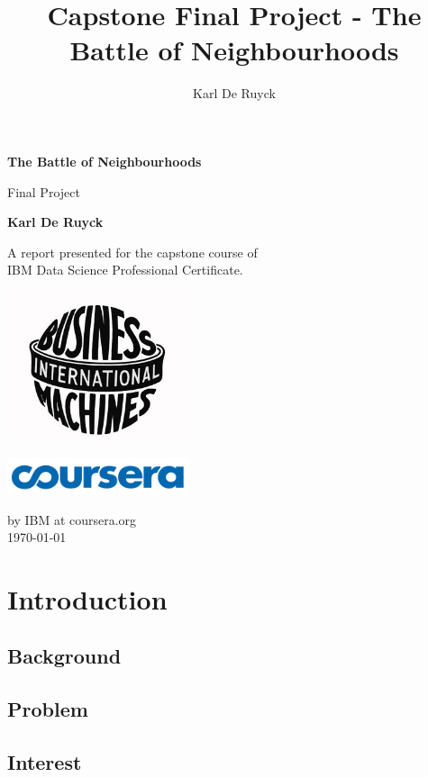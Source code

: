 \documentclass[10pt,a4paper,final,titlepage]{report}
\author{Karl De Ruyck}
\title{Capstone Final Project - The Battle of Neighbourhoods}
\begin{document}
	\onehalfspacing
	\begin{titlepage}
		\begin{center}

			\vspace*{3cm}
			{\Huge \textbf{The Battle of Neighbourhoods}}\\
					
			\vspace{1cm}
			
			{\LARGE Final Project}
			
			\vspace{2cm}
			
			\textbf{Karl De Ruyck}
			
			\vfill
			
			A report presented for the capstone course of\\
			\vspace{0.25cm}
			IBM Data Science Professional Certificate.
			
			\vspace{2cm}
			
			\includegraphics[width=0.4\textwidth]{ibm.jpg}\\
			
			\vspace{0.2cm}
			
			\includegraphics[width=0.4\textwidth]{coursera.png}
			
			\vspace{0.4cm}
			
			by IBM at coursera.org\\
			\today
			\restoregeometry
		\end{center}
	\end{titlepage}


	\chapter{Introduction}
		\section{Background}
		
		
		\section{Problem}
		
		
		\section{Interest}
\end{document}
